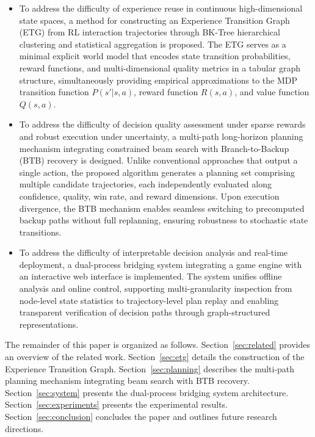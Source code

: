 \documentclass[letterpaper]{article}
\begin{document}
\begin{itemize}[leftmargin=15pt,label=$\bullet$]
	\item To address the difficulty of experience reuse in continuous high-dimensional state spaces, a method for constructing an Experience Transition Graph (ETG) from RL interaction trajectories through BK-Tree hierarchical clustering and statistical aggregation is proposed. The ETG serves as a minimal explicit world model that encodes state transition probabilities, reward functions, and multi-dimensional quality metrics in a tabular graph structure, simultaneously providing empirical approximations to the MDP transition function $P(s'|s,a)$, reward function $R(s,a)$, and value function $Q(s,a)$.
	\item To address the difficulty of decision quality assessment under sparse rewards and robust execution under uncertainty, a multi-path long-horizon planning mechanism integrating constrained beam search with Branch-to-Backup (BTB) recovery is designed. Unlike conventional approaches that output a single action, the proposed algorithm generates a planning set comprising multiple candidate trajectories, each independently evaluated along confidence, quality, win rate, and reward dimensions. Upon execution divergence, the BTB mechanism enables seamless switching to precomputed backup paths without full replanning, ensuring robustness to stochastic state transitions.
	\item To address the difficulty of interpretable decision analysis and real-time deployment, a dual-process bridging system integrating a game engine with an interactive web interface is implemented. The system unifies offline analysis and online control, supporting multi-granularity inspection from node-level state statistics to trajectory-level plan replay and enabling transparent verification of decision paths through graph-structured representations.
\end{itemize}

The remainder of this paper is organized as follows. Section~\ref{sec:related} provides an overview of the related work. Section~\ref{sec:etg} details the construction of the Experience Transition Graph. Section~\ref{sec:planning} describes the multi-path planning mechanism integrating beam search with BTB recovery. Section~\ref{sec:system} presents the dual-process bridging system architecture. Section~\ref{sec:experiments} presents the experimental results. Section~\ref{sec:conclusion} concludes the paper and outlines future research directions.
\end{document}
